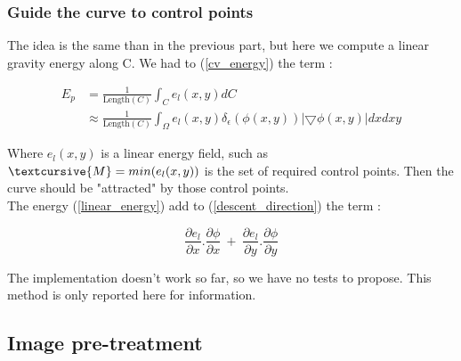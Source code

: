 \subsubsection*{Guide the curve to control points}

The idea is the same than in the previous part, but here we compute a linear gravity energy along C.
We had to (\ref{cv_energy}) the term : 

\begin{equation}
\begin{split}
    E_p &= \frac{1}{\text{Length}(C)} \int_{C} e_l(x,y)dC \\ &\approx \frac{1}{\text{Length}(C)} \int_{\Omega} e_l(x,y) \delta_{\epsilon}(\phi(x,y)) |\bigtriangledown \phi(x,y)| dxdxy 
\label{linear_energy}
\end{split}
\end{equation}

Where $e_l(x,y)$ is a linear energy field, such as $\textcursive{M} = min(e_l(x,y))$ is the set of required control points. Then the curve should be "attracted" by those control points. 
\\The energy (\ref{linear_energy}) add to (\ref{descent_direction}) the term :

\begin{equation}
    \frac{\partial e_l}{\partial x}.\frac{\partial \phi}{\partial x} \ + \ \frac{\partial e_l}{\partial y}.\frac{\partial \phi}{\partial y}
\end{equation}

The implementation doesn't work so far, so we have no tests to propose. This method is only reported here for information.





\subsection{Image pre-treatment}  
